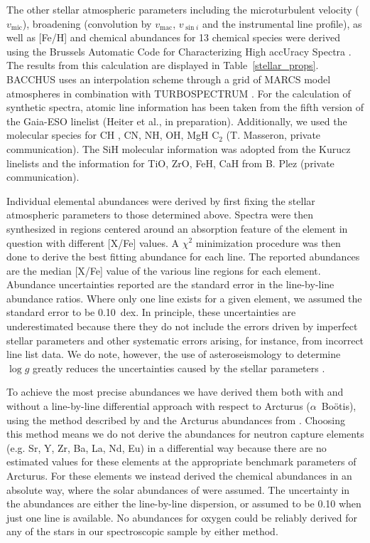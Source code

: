 \documentclass[modern]{aastex62}
\newcommand{\logg}{\mbox{$\log g$}\xspace}
\begin{document}
The other stellar atmospheric parameters including the microturbulent velocity ($v_{\text{mic}}$), broadening (convolution by $v_{\text{mac}}$, $v_{\sin{i}}$ and the instrumental line profile), as well as [Fe/H] and chemical abundances for 13 chemical species were derived using the Brussels Automatic Code for Characterizing High accUracy Spectra \citep[BACCHUS:][]{bacchus}. The results from this calculation are displayed in Table~\ref{stellar_props}. BACCHUS uses an interpolation scheme through a grid of MARCS model atmospheres \citep{Gustafsson2008} in combination with TURBOSPECTRUM \citep{Alvarez1998, Plez2012}. For the calculation of synthetic spectra, atomic line information has been taken from the fifth version of the Gaia-ESO linelist (Heiter et al., in preparation). Additionally, we used the molecular species for CH \citep{Masseron2014}, CN, NH, OH, MgH  C$_{2}$ (T. Masseron, private communication). The SiH molecular information was adopted from the Kurucz linelists and the information for TiO, ZrO, FeH, CaH from B. Plez (private communication). 

Individual elemental abundances were derived by first fixing the stellar atmospheric parameters to those determined above. Spectra were then synthesized in regions centered around an absorption feature of the element in question with different [X/Fe] values. A $\chi^2$ minimization procedure was then done to derive the best fitting abundance for each line. The reported abundances are the median [X/Fe] value of the various line regions for each element. Abundance uncertainties reported are the standard error in the line-by-line abundance ratios. Where only one line exists for a given element, we assumed the standard error to be 0.10~dex. In principle, these uncertainties are underestimated because there they do not include the errors driven by imperfect stellar parameters and other systematic errors arising, for instance, from incorrect line list data. We do note, however, the use of asteroseismology to determine \logg greatly reduces the uncertainties caused by the stellar parameters \citep[see][for a longer discussion on this]{hawkinsapogee}. 

To achieve the most precise abundances we have derived them both with and without a line-by-line differential approach with respect to Arcturus ($\alpha$~Bo\"{o}tis), using the method described by \citet{hawkinsapogee} and the Arcturus abundances from \citet{gaiabenchmark4}. Choosing this method means we do not derive the abundances for neutron capture  elements (e.g. Sr, Y, Zr, Ba, La, Nd, Eu) in a differential way because there are no estimated values for these elements at the appropriate benchmark parameters of Arcturus. For these elements we instead derived the chemical abundances in an absolute way, where the solar abundances of \cite{Asplund2005} were assumed. The uncertainty in the abundances are either the line-by-line dispersion, or assumed to be 0.10 when just one line is available. No abundances for oxygen could be reliably derived for any of the stars in our spectroscopic sample by either method.
\end{document}
